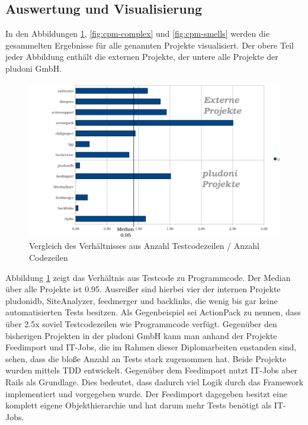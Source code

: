 \subsection{Auswertung und Visualisierung}
\label{sec:auswertungFinal}
In den Abbildungen \ref{fig:cpm-loclot}, \ref{fig:cpm-complex} und \ref{fig:cpm-smells} werden die gesammelten Ergebnisse für alle genannten Projekte visualisiert. Der obere Teil jeder Abbildung enthält die externen Projekte, der untere alle Projekte der pludoni GmbH.
\begin{figure}[htbp]
 \centering
 \includegraphics[width=\linewidth]{./diagrams/cpm-lotloc.pdf}
 \caption{Vergleich des Verhältnisses aus Anzahl Testcodezeilen / Anzahl Codezeilen}
 \label{fig:cpm-loclot}
\end{figure}

Abbildung \ref{fig:cpm-loclot} zeigt das Verhältnis aus Testcode zu Programmcode. Der Median über alle Projekte ist 0.95. Ausreißer sind hierbei vier der internen Projekte pludonidb, SiteAnalyzer, feedmerger und backlinks, die wenig bis gar keine automatisierten  Tests besitzen. Als Gegenbeispiel sei ActionPack zu nennen, dass über 2.5x soviel Testcodezeilen wie Programmcode verfügt. Gegenüber den bisherigen Projekten in der pludoni GmbH kann man anhand der Projekte Feedimport und IT-Jobs, die im Rahmen dieser Diplomarbeiten enstanden sind, sehen, dass die bloße Anzahl an Tests stark zugenommen hat. Beide Projekte wurden mittels TDD entwickelt. Gegenüber dem Feedimport nutzt IT-Jobs aber Rails als Grundlage. Dies bedeutet, dass dadurch viel Logik durch das Framework implementiert und vorgegeben wurde. Der Feedimport dagegeben besitzt eine komplett eigene Objekthierarchie und hat darum mehr Tests benötigt als IT-Jobs.


